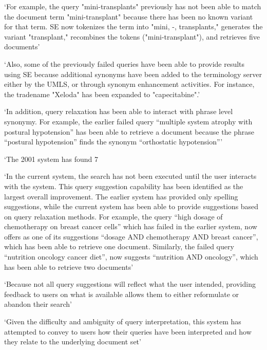 \documentclass[]{article}
\begin{document}
{{‘For example, the query "mini-transplants" previously has not been able to match the document term "mini-transplant" because there has been no known variant for that term. SE now tokenizes the term into "mini, -, transplants," generates the variant "transplant," recombines the tokens ("mini-transplant"), and retrieves five documents’

‘Also, some of the previously failed queries have been able to provide results using SE because additional synonyms have been added to the terminology server either by the UMLS, or through synonym enhancement activities. For instance, the tradename "Xeloda" has been expanded to "capecitabine".’

‘In addition, query relaxation has been able to interact with phrase level synonymy. For example, the earlier failed query “multiple system atrophy with postural hypotension” has been able to retrieve a document because the phrase “postural hypotension” finds the synonym “orthostatic hypotension”’

‘The 2001 system has found 7%

‘In the current system, the search has not been executed until the user interacts with the system. This query suggestion capability has been identified as the largest overall improvement. The earlier system has provided only spelling suggestions, while the current system has been able to provide suggestions based on query relaxation methods. For example, the query “high dosage of chemotherapy on breast cancer cells” which has failed in the earlier system, now offers as one of its suggestions “dosage AND chemotherapy AND breast cancer”, which has been able to retrieve one document. Similarly, the failed query “nutrition oncology cancer diet”, now suggests “nutrition AND oncology”, which has been able to retrieve two documents’ 

‘Because not all query suggestions will reflect what the user intended, providing feedback to users on what is available allows them to either reformulate or abandon their search’

‘Given the difficulty and ambiguity of query interpretation, this system has attempted to convey to users how their queries have been interpreted and how they relate to the underlying document set’

}}
\end{document}
